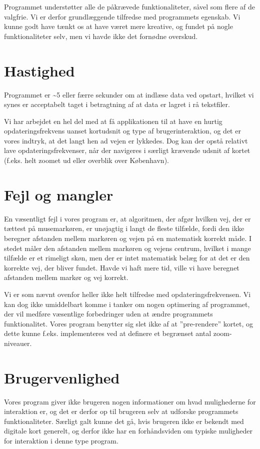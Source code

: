 Programmet understøtter alle de påkrævede funktionaliteter, såvel som flere af de valgfrie. Vi er derfor grundlæggende tilfredse med programmets egenskab. Vi kunne godt have tænkt os at have været mere kreative, og fundet på nogle funktionaliteter selv, men vi havde ikke det fornødne overskud.

\section{Hastighed}

Programmet er \textasciitilde5 eller færre sekunder om at indlæse data ved opstart, hvilket vi synes er acceptabelt taget i betragtning af at data er lagret i rå tekstfiler.

Vi har arbejdet en hel del med at få applikationen til at have en hurtig opdateringsfrekvens uanset kortudsnit og type af brugerinteraktion, og det er vores indtryk, at det langt hen ad vejen er lykkedes. Dog kan der opstå relativt lave opdateringsfrekvenser, når der navigeres i særligt krævende udsnit af kortet (f.eks. helt zoomet ud eller overblik over København).

\section{Fejl og mangler}

En væsentligt fejl i vores program er, at algoritmen, der afgør hvilken vej, der er tættest på musemarkøren, er unøjagtig i langt de fleste tilfælde, fordi den ikke beregner afstanden mellem markøren og vejen på en matematisk korrekt måde. I stedet måler den afstanden mellem markøren og vejens centrum, hvilket i mange tilfælde er et rimeligt skøn, men der er intet matematisk belæg for at det er den korrekte vej, der bliver fundet. Havde vi haft mere tid, ville vi have beregnet afstanden mellem markør og vej korrekt.

Vi er som nævnt ovenfor heller ikke helt tilfredse med opdateringsfrekvensen. Vi kan dog ikke umiddelbart komme i tanker om nogen optimering af programmet, der vil medføre væsentlige forbedringer uden at ændre programmets funktionalitet. Vores program benytter sig slet ikke af at ''pre-rendere'' kortet, og dette kunne f.eks. implementeres ved at definere et begrænset antal zoom-niveauer.

\section{Brugervenlighed}

Vores program giver ikke brugeren nogen informationer om hvad mulighederne for interaktion er, og det er derfor op til brugeren selv at udforske programmets funktionaliteter. Særligt galt kunne det gå, hvis brugeren ikke er bekendt med digitale kort generelt, og derfor ikke har en forhåndsviden om typiske muligheder for interaktion i denne type program.